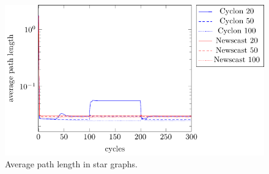 \documentclass[a4paper]{ifacconf}
\begin{document}
\begin{figure}[p]
    \centering
    \includegraphics[width=.9\linewidth]{"figures/average_path_length/average path length star"}
    \caption{Average path length in star graphs.}
    \label{fig:average-path-length-star}
\end{figure}
\end{document}

